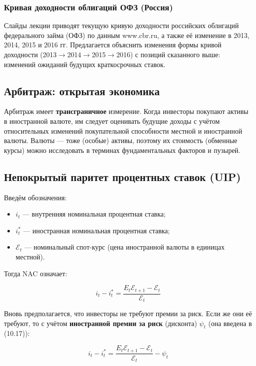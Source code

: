 \documentclass[10pt,a4paper]{article}
\begin{document}
\subsubsection{Кривая доходности облигаций ОФЗ (Россия)}

Слайды лекции приводят текущую кривую доходности российских облигаций федерального займа (ОФЗ) по данным www.cbr.ru, а также её изменение в 2013, 2014, 2015 и 2016 гг. Предлагается объяснить изменения формы кривой доходности (2013$\to$2014$\to$2015$\to$2016) с позиций сказанного выше: изменений ожиданий будущих краткосрочных ставок.

\subsection{Арбитраж: открытая экономика}

Арбитраж имеет \textbf{трансграничное} измерение. Когда инвесторы покупают активы в иностранной валюте, им следует оценивать будущие доходы с учётом относительных изменений покупательной способности местной и иностранной валюты. Валюты — тоже (особые) активы, поэтому их стоимость (обменные курсы) можно исследовать в терминах фундаментальных факторов и пузырей.

\subsection{Непокрытый паритет процентных ставок (UIP)}

Введём обозначения:
\begin{itemize}[leftmargin=1.3em]
\item $i_t$ — внутренняя номинальная процентная ставка;
\item $i^{*}_t$ — иностранная номинальная процентная ставка;
\item $\mathcal{E}_t$ — номинальный спот-курс (цена иностранной валюты в единицах местной).
\end{itemize}
Тогда NAC означает:
\begin{formulabox}
\begin{equation}
i_t - i^{*}_t = \frac{E_t\mathcal{E}_{t+1}-\mathcal{E}_t}{\mathcal{E}_t} \tag{10.15}
\end{equation}
\end{formulabox}
Вновь предполагается, что инвесторы не требуют премии за риск. Если же они её требуют, то с учётом \textbf{иностранной премии за риск} (дисконта) $\psi_t$ (она введена в (10.17)):
\begin{formulabox}
\begin{equation}
i_t - i^{*}_t = \frac{E_t\mathcal{E}_{t+1}-\mathcal{E}_t}{\mathcal{E}_t} - \psi_t \tag{10.15$'$}
\end{equation}
\end{formulabox}
\end{document}
